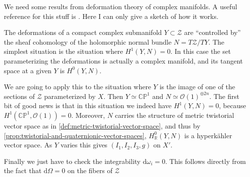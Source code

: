 \documentclass[12pt,letterpaper,reqno]{article}
\numberwithin{equation}{section}
\newcommand{\cZ}{\ensuremath{\mathcal Z}}
\newcommand{\cO}{\ensuremath{\mathcal O}}
\newcommand{\R}{\ensuremath{\mathbb R}}
\newcommand{\C}{\ensuremath{\mathbb C}}
\newcommand{\PP}{\ensuremath{\mathbb P}}
\newcommand{\hk}{hyperk\"ahler\xspace}
\newcommand{\de}{\mathrm{d}}
\newcommand{\ti}[1]{\textit{#1}}
\newcommand{\fixme}[1]{{\color{orange}{[#1]}}}
\begin{document}
\begin{pf} We need some results from deformation theory of
complex manifolds. A useful reference for this stuff is
\cite{MR2093043}. Here I can only give a sketch of how it works.

The deformations of a compact complex submanifold $Y \subset \cZ$
are ``controlled by'' the sheaf cohomology of the
holomorphic normal bundle $N = T\cZ / TY$.
The simplest situation is the situation where $H^1(Y,N) = 0$.
In this case the set parameterizing the deformations is
actually a complex manifold, and its tangent space at a given
$Y$ is $H^0(Y,N)$.

We are going to apply this to the situation
where $Y$ is the image of one of the sections of $\cZ$
parameterized by $X$.
Then $Y \simeq \C\PP^1$ and $N \simeq \cO(1)^{\oplus 2n}$.
The first bit of good
news is that in this situation we indeed have $H^1(Y,N) = 0$,
because $H^1(\C\PP^1, \cO(1)) = 0$.
Moreover, $N$ carries the structure of metric
twistorial vector space as in
\autoref{def:metric-twistorial-vector-space}, and thus by
\autoref{prop:twistorial-and-quaternionic-vector-spaces},
$H^0_\R(Y,N)$ is a \hk vector space.
As $Y$ varies this gives $(I_1,I_2,I_3,g)$ on $X'$.

Finally we just have to check the integrability $\de \omega_i = 0$.
This follows directly from the fact that $\de \Omega = 0$
on the fibers of $\cZ$ \fixme{...}
\end{pf}




\end{document}
